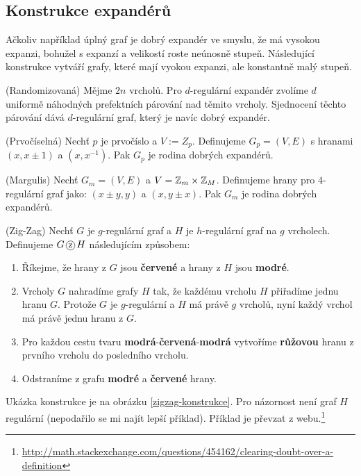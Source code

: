 \subsection{Konstrukce expandérů}


Ačkoliv například úplný graf je dobrý expandér ve smyslu, že má vysokou 
expanzi, bohužel s expanzí a velikostí roste neúnosně stupeň. Následující 
konstrukce vytváří grafy, které mají vyokou expanzi, ale konstantně malý 
stupeň.

\vt (Randomizovaná) Mějme $2n$ vrcholů. Pro $d$-regulární expandér zvolíme $d$ 
uniformě náhodných prefektních párování nad těmito vrcholy. Sjednocení těchto 
párování dává $d$-regulární graf, který je navíc dobrý expandér.

\vt (Prvočíselná) Nechť $p$ je prvočíslo a $V:=Z_p$. Definujeme $G_p=(V,E)$ s 
hranami $(x, x\pm 1)$ a $(x,x^{-1})$. Pak $G_p$ je rodina dobrých expandérů.

\vt (Margulis) Nechť $G_m=(V,E)$ a $V=\mathbb{Z}_m \times \mathbb{Z}_M$. Definujeme hrany pro 
$4$-regulární graf jako: $(x\pm y, y)$ a $(x,y\pm x)$. Pak $G_m$ je rodina 
dobrých expandérů.

\df (Zig-Zag) Nechť $G$ je $g$-regulární graf a $H$ je $h$-regulární graf na $g$ 
vrcholech. Definujeme $G \zz H$ následujícím způsobem:
\begin{enumerate}
	\item Říkejme, že hrany z $G$ jsou {\bf\color{red}červené} a hrany z $H$ 
		jsou {\bf\color{blue}modré}.
	\item Vrcholy $G$ nahradíme grafy $H$ tak, že každému vrcholu $H$ přiřadíme 
	jednu hranu $G$. Protože $G$ je $g$-regulární a $H$ má právě $g$ vrcholů, 
	nyní každý vrchol má právě jednu hranu z $G$.
	\item Pro každou cestu tvaru 
		{\bf\color{blue}modrá}-{\bf\color{red}červená}-{\bf\color{blue}modrá} 
		vytvoříme {\bf\color{magenta}růžovou} hranu z prvního vrcholu do 
		posledního vrcholu.
	\item Odstraníme z grafu {\bf\color{blue}modré} a {\bf\color{red}červené} 
		hrany.
\end{enumerate}
Ukázka konstrukce je na obrázku \ref{zigzag-konstrukce}. Pro názornost není
graf $H$ regulární (nepodařilo se mi najít lepší příklad). Příklad je převzat z
webu.\footnote{\url{http://math.stackexchange.com/questions/454162/clearing-doubt-over-a-definition}}

